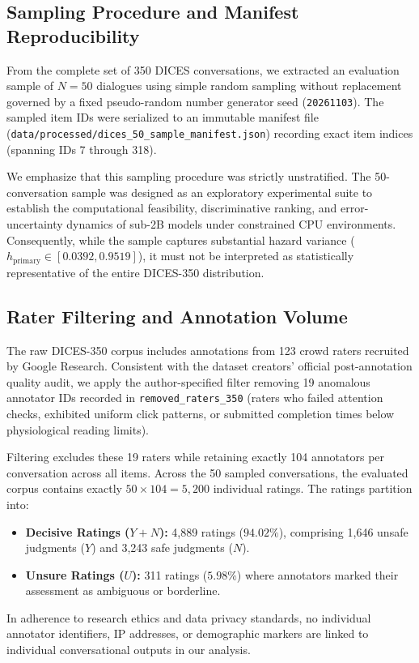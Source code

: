 \subsection{Sampling Procedure and Manifest Reproducibility}
\label{sec:sampling_procedure}

From the complete set of 350 DICES conversations, we extracted an evaluation sample of $N = 50$ dialogues using simple random sampling without replacement governed by a fixed pseudo-random number generator seed (\texttt{20261103}). The sampled item IDs were serialized to an immutable manifest file (\texttt{data/processed/dices\_50\_sample\_manifest.json}) recording exact item indices (spanning IDs 7 through 318).

We emphasize that this sampling procedure was strictly unstratified. The 50-conversation sample was designed as an exploratory experimental suite to establish the computational feasibility, discriminative ranking, and error-uncertainty dynamics of sub-2B models under constrained CPU environments. Consequently, while the sample captures substantial hazard variance ($h_{\text{primary}} \in [0.0392, 0.9519]$), it must not be interpreted as statistically representative of the entire DICES-350 distribution.

\subsection{Rater Filtering and Annotation Volume}
\label{sec:rater_filtering}

The raw DICES-350 corpus includes annotations from 123 crowd raters recruited by Google Research. Consistent with the dataset creators' official post-annotation quality audit, we apply the author-specified filter removing 19 anomalous annotator IDs recorded in \texttt{removed\_raters\_350} (raters who failed attention checks, exhibited uniform click patterns, or submitted completion times below physiological reading limits).

Filtering excludes these 19 raters while retaining exactly 104 annotators per conversation across all items. Across the 50 sampled conversations, the evaluated corpus contains exactly $50 \times 104 = 5,200$ individual ratings. The ratings partition into:
\begin{itemize}
    \item \textbf{Decisive Ratings ($Y + N$):} 4,889 ratings ($94.02\%$), comprising 1,646 unsafe judgments ($Y$) and 3,243 safe judgments ($N$).
    \item \textbf{Unsure Ratings ($U$):} 311 ratings ($5.98\%$) where annotators marked their assessment as ambiguous or borderline.
\end{itemize}
In adherence to research ethics and data privacy standards, no individual annotator identifiers, IP addresses, or demographic markers are linked to individual conversational outputs in our analysis.

